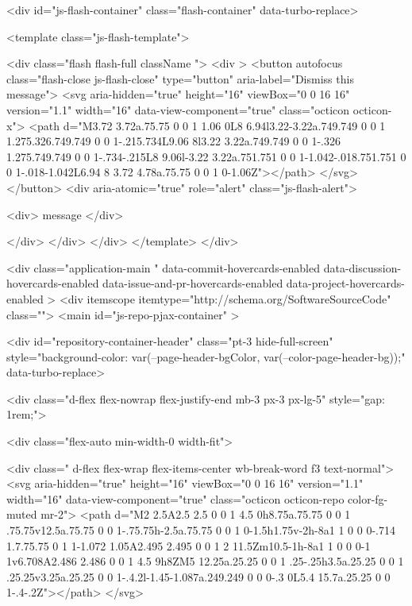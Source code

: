     <div id="js-flash-container" class="flash-container" data-turbo-replace>




  <template class="js-flash-template">
    
<div class="flash flash-full   {{ className }}">
  <div >
    <button autofocus class="flash-close js-flash-close" type="button" aria-label="Dismiss this message">
      <svg aria-hidden="true" height="16" viewBox="0 0 16 16" version="1.1" width="16" data-view-component="true" class="octicon octicon-x">
    <path d="M3.72 3.72a.75.75 0 0 1 1.06 0L8 6.94l3.22-3.22a.749.749 0 0 1 1.275.326.749.749 0 0 1-.215.734L9.06 8l3.22 3.22a.749.749 0 0 1-.326 1.275.749.749 0 0 1-.734-.215L8 9.06l-3.22 3.22a.751.751 0 0 1-1.042-.018.751.751 0 0 1-.018-1.042L6.94 8 3.72 4.78a.75.75 0 0 1 0-1.06Z"></path>
</svg>
    </button>
    <div aria-atomic="true" role="alert" class="js-flash-alert">
      
      <div>{{ message }}</div>

    </div>
  </div>
</div>
  </template>
</div>


    






  <div
    class="application-main "
    data-commit-hovercards-enabled
    data-discussion-hovercards-enabled
    data-issue-and-pr-hovercards-enabled
    data-project-hovercards-enabled
  >
        <div itemscope itemtype="http://schema.org/SoftwareSourceCode" class="">
    <main id="js-repo-pjax-container" >
      
      
    

    






  
  <div id="repository-container-header"  class="pt-3 hide-full-screen" style="background-color: var(--page-header-bgColor, var(--color-page-header-bg));" data-turbo-replace>

      <div class="d-flex flex-nowrap flex-justify-end mb-3  px-3 px-lg-5" style="gap: 1rem;">

        <div class="flex-auto min-width-0 width-fit">
            
  <div class=" d-flex flex-wrap flex-items-center wb-break-word f3 text-normal">
      <svg aria-hidden="true" height="16" viewBox="0 0 16 16" version="1.1" width="16" data-view-component="true" class="octicon octicon-repo color-fg-muted mr-2">
    <path d="M2 2.5A2.5 2.5 0 0 1 4.5 0h8.75a.75.75 0 0 1 .75.75v12.5a.75.75 0 0 1-.75.75h-2.5a.75.75 0 0 1 0-1.5h1.75v-2h-8a1 1 0 0 0-.714 1.7.75.75 0 1 1-1.072 1.05A2.495 2.495 0 0 1 2 11.5Zm10.5-1h-8a1 1 0 0 0-1 1v6.708A2.486 2.486 0 0 1 4.5 9h8ZM5 12.25a.25.25 0 0 1 .25-.25h3.5a.25.25 0 0 1 .25.25v3.25a.25.25 0 0 1-.4.2l-1.45-1.087a.249.249 0 0 0-.3 0L5.4 15.7a.25.25 0 0 1-.4-.2Z"></path>
</svg>
    
